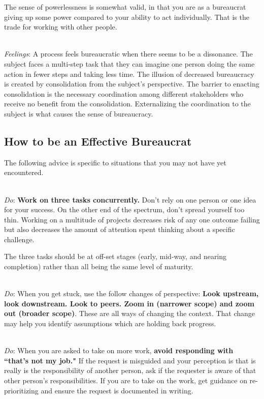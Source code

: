 The sense of powerlessness is somewhat valid, in that you are as a bureaucrat giving up some power compared to your ability to act individually. That is the trade for working with other people.

\ \\
\textit{Feelings}: A process feels bureaucratic when there seems to be a dissonance. The subject faces a multi-step task that they can imagine one person doing the same action in fewer steps and taking less time. The illusion of decreased bureaucracy is created by consolidation from the subject's perspective. The barrier to enacting consolidation is the necessary coordination among different stakeholders who receive no benefit from the consolidation. Externalizing the coordination to the subject is what causes the sense of bureaucracy. 

\subsection*{How to be an Effective Bureaucrat}

The following advice is specific to situations that you may not have yet encountered. 

\ \\
\textit{Do}: \textbf{Work on three tasks concurrently.} Don't rely on one person or one idea for your success. On the other end of the spectrum, don't spread yourself too thin.
Working on a multitude of projects decreases risk of any one outcome failing but also decreases the amount of attention spent thinking about a specific challenge. 

The three tasks should be at off-set stages (early, mid-way, and nearing completion) rather than all being the same level of maturity.

\ \\
\textit{Do}: When you get stuck, use the follow changes of perspective:  
\textbf{Look upstream, look downstream. Look to peers. Zoom in (narrower scope) and zoom out (broader scope)}. These are all ways of changing the context. That change may help you identify assumptions which are holding back progress.

\ \\
\textit{Do}: When you are asked to take on more work, \textbf{avoid responding with ``that's not my job."} If the request is misguided and your perception is that is really is the responsibility of another person, ask if the requester is aware of that other person's responsibilities. If you are to  take on the work, get guidance on re-prioritizing and ensure the request is documented in writing. 

